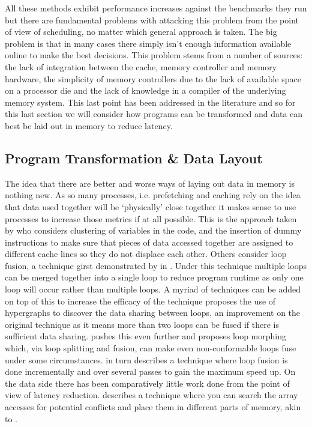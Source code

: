 All these methods exhibit performance increases against the benchmarks they run but there are fundamental problems with attacking this problem from the point of view of scheduling, no matter which general approach is taken. The big problem is that in many cases there simply isn't enough information available online to make the best decisions. This problem stems from a number of sources: the lack of integration between the cache, memory controller and memory hardware, the simplicity of memory controllers due to the lack of available space on a processor die and the lack of knowledge in a compiler of the underlying memory system. This last point has been addressed in the literature and so for this last section we will consider how programs can be transformed and data can best be laid out in memory to reduce latency. 

\subsection{Program Transformation \& Data Layout}

The idea that there are better and worse ways of laying out data in memory is nothing new. As so many processes, i.e. prefetching and caching rely on the idea that data used together will be `physically' close together it makes sense to use processes to increase those metrics if at all possible. This is the approach taken by \citet{pandaMemoryDataOrganization1997} who considers clustering of variables in the code, and the insertion of dummy instructions to make sure that pieces of data accessed together are assigned to different cache lines so they do not displace each other. Others consider loop fusion, a technique girst demonstrated by \citet{gaoCollectiveLoopFusion1993} in \citeyear{gaoCollectiveLoopFusion1993}. Under this technique multiple loops can be merged together into a single loop to reduce program runtime as only one loop will occur rather than multiple loops. A myriad of techniques can be added on top of this to increase the efficacy of the technique \citet{dingMemoryBandwidthBottleneck2000} proposes the use of hypergraphs to discover the data sharing between loops, an improvement on the original technique as it means more than two loops can be fused if there is sufficient data sharing. \citet{gomezOptimizingMemoryBandwidth2004} pushes this even further and proposes loop morphing which, via loop splitting and fusion, can make even non-conformable loops fuse under some circumstances. \citet{marchalOptimizingMemoryBandwidth2004} in turn describes a technique where loop fusion is done incrementally and over several passes to gain the maximum speed up. On the data side there has been comparatively little work done from the point of view of latency reduction. \citet{qaziOptimizationAccessLatency2016} describes a technique where you can search the array accesses for potential conflicts and place them in different parts of memory, akin to \citet{pandaMemoryDataOrganization1997}. 

